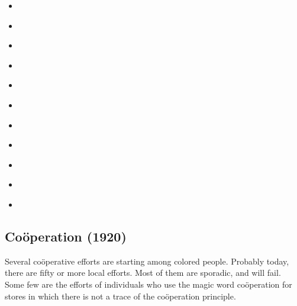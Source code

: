 \documentclass[letterpaper,10pt,english]{jupyterBook}
\begin{document}
\begin{itemize}
\item {} 
\sphinxAtStartPar
{\hyperref[\detokenize{Volumes/19/04/cooperation::doc}]{}}

\item {} 
\sphinxAtStartPar
{\hyperref[\detokenize{Volumes/22/03/negro_and_radical_thought::doc}]{}}

\item {} 
\sphinxAtStartPar
{\hyperref[\detokenize{Volumes/22/04/class_struggle::doc}]{}}

\item {} 
\sphinxAtStartPar
{\hyperref[\detokenize{Volumes/22/06/socialism_and_the_negro::doc}]{}}

\item {} 
\sphinxAtStartPar
{\hyperref[\detokenize{Volumes/22/06/single_tax::doc}]{}}

\item {} 
\sphinxAtStartPar
{\hyperref[\detokenize{Volumes/27/03/black_man_and_the_wounded_world::doc}]{}}

\item {} 
\sphinxAtStartPar
{\hyperref[\detokenize{Volumes/33/01/russia_1926::doc}]{}}

\item {} 
\sphinxAtStartPar
{\hyperref[\detokenize{Volumes/33/04/judging_russia::doc}]{}}

\item {} 
\sphinxAtStartPar
{\hyperref[\detokenize{Volumes/35/11/dunbar_national_bank::doc}]{}}

\item {} 
\sphinxAtStartPar
{\hyperref[\detokenize{Volumes/38/09/negro_and_communism::doc}]{}}

\item {} 
\sphinxAtStartPar
{\hyperref[\detokenize{Volumes/40/07/our_class_struggle::doc}]{}}

\end{itemize}


\subsection{Coöperation (1920)}
\label{\detokenize{Volumes/19/04/cooperation:cooperation-1920}}\label{\detokenize{Volumes/19/04/cooperation::doc}}
\sphinxAtStartPar
Several coöperative efforts are starting among colored people. Probably today, there are fifty or more local efforts. Most of them are sporadic, and will fail. Some few are the efforts of individuals who use the magic word coöperation for stores in which there is not a trace of the coöperation principle.
\end{document}
